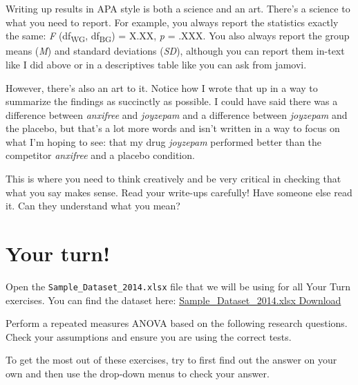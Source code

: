 \documentclass[
]{book}
\begin{document}
Writing up results in APA style is both a science and an art. There's a science to what you need to report. For example, you always report the statistics exactly the same: \emph{F} (df\textsubscript{WG}, df\textsubscript{BG}) = X.XX, \emph{p} = .XXX. You also always report the group means (\emph{M}) and standard deviations (\emph{SD}), although you can report them in-text like I did above or in a descriptives table like you can ask from jamovi.

However, there's also an art to it. Notice how I wrote that up in a way to summarize the findings as succinctly as possible. I could have said there was a difference between \emph{anxifree} and \emph{joyzepam} and a difference between \emph{joyzepam} and the placebo, but that's a lot more words and isn't written in a way to focus on what I'm hoping to see: that my drug \emph{joyzepam} performed better than the competitor \emph{anxifree} and a placebo condition.

This is where you need to think creatively and be very critical in checking that what you say makes sense. Read your write-ups carefully! Have someone else read it. Can they understand what you mean?

\hypertarget{your-turn-3}{%
\section{Your turn!}\label{your-turn-3}}

Open the \texttt{Sample\_Dataset\_2014.xlsx} file that we will be using for all Your Turn exercises. You can find the dataset here: \href{https://github.com/danawanzer/stats-with-jamovi/blob/master/data/Sample_Dataset_2014.xlsx}{Sample\_Dataset\_2014.xlsx Download}

Perform a repeated measures ANOVA based on the following research questions. Check your assumptions and ensure you are using the correct tests.

To get the most out of these exercises, try to first find out the answer on your own and then use the drop-down menus to check your answer.
\end{document}

